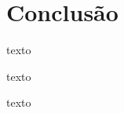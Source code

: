 \section{Conclusão} \label{section: Conclusao}
texto
\par \vspace{6pt}
texto
\par \vspace{6pt}
texto